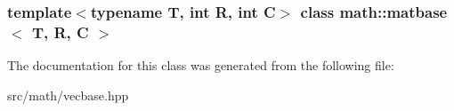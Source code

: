 \subsubsection*{template$<$typename T, int R, int C$>$ class math::matbase$<$ T, R, C $>$}



The documentation for this class was generated from the following file:\begin{DoxyCompactItemize}
\item 
src/math/vecbase.hpp\end{DoxyCompactItemize}
